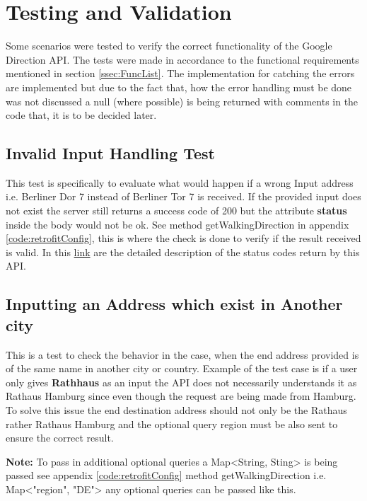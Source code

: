 \chapter{Testing and Validation}
Some scenarios were tested to verify the
correct functionality of the Google Direction
API. The tests were made in accordance
to the functional requirements mentioned
in section \ref{ssec:FuncList}. The implementation for 
catching the errors are implemented but due to the fact that,
how the error handling must be done was not discussed a null (where possible) 
is being returned with comments in the code that, it is to be decided later. 

\section{Invalid Input Handling Test}
    This test is specifically to evaluate what would happen if a wrong Input address i.e. 
    Berliner Dor 7 instead of Berliner Tor 7 is received. If the provided input does not exist
    the server still returns a success code of 200 but the attribute \textbf{status} inside the body
    would not be ok. See method getWalkingDirection in appendix 
    \ref{code:retrofitConfig}, this is where the check is done to verify
    if the result received is valid. In this 
    \href{https://developers.google.com/maps/documentation/javascript/directions#DirectionsRegionBiasing} 
    {link} are the detailed description of the status codes return by this API.

\section{Inputting an Address which exist in Another city}
    This is a test to check the behavior in the case, when the 
    end address provided is of the same name in another city or country. 
    Example of the test case is if a user only gives \textbf{Rathhaus} 
    as an input the API does not necessarily understands it as Rathaus Hamburg since
    even though the request are being made from Hamburg.
    To solve this issue the end destination address should not only
    be the Rathaus rather Rathaus Hamburg and the optional
    query region must be also sent to ensure the correct
    result. 
    
    \textbf{Note: }To pass in additional optional queries a Map<String, Sting>
    is being passed see appendix \ref{code:retrofitConfig} method getWalkingDirection
    i.e. Map<"region", "DE"> any optional queries can be passed like this.

